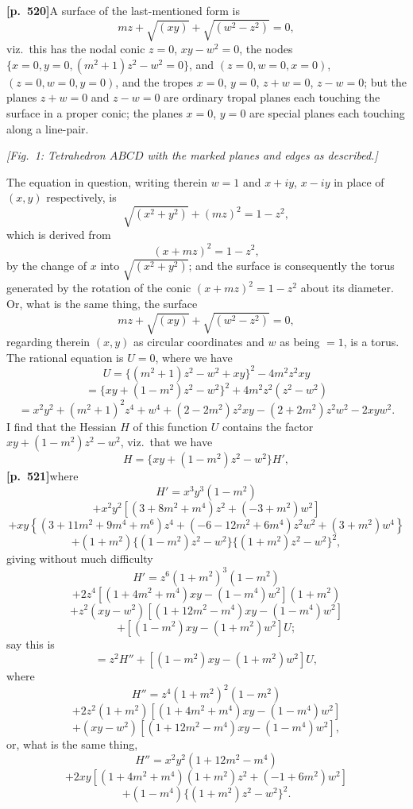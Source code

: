 \documentclass[11pt,a4paper]{article}
\begin{document}
\noindent\textbf{[p.~520]}\quad A surface of the last-mentioned form is
\[
mz + \sqrt{(xy)} + \sqrt{(w^{2} - z^{2})} = 0,
\]
viz.\ this has the nodal conic $z = 0$, $xy - w^{2} = 0$, the nodes $\{x = 0, y = 0, (m^{2} + 1)z^{2} - w^{2} = 0\}$, and $(z = 0, w = 0, x = 0)$, $(z = 0, w = 0, y = 0)$, and the tropes $x = 0$, $y = 0$, $z + w = 0$, $z - w = 0$; but the planes $z + w = 0$ and $z - w = 0$ are ordinary tropal planes each touching the surface in a proper conic; the planes $x = 0$, $y = 0$ are special planes each touching along a line-pair.

\begin{center}
\textit{[Fig.~1: Tetrahedron $ABCD$ with the marked planes and edges as described.]}
\end{center}

The equation in question, writing therein $w = 1$ and $x + iy$, $x - iy$ in place of $(x, y)$ respectively, is
\[
\sqrt{(x^{2} + y^{2})} + (mz)^{2} = 1 - z^{2},
\]
which is derived from
\[
(x + mz)^{2} = 1 - z^{2},
\]
by the change of $x$ into $\sqrt{(x^{2} + y^{2})}$; and the surface is consequently the torus generated by the rotation of the conic $(x + mz)^{2} = 1 - z^{2}$ about its diameter. Or, what is the same thing, the surface
\[
mz + \sqrt{(xy)} + \sqrt{(w^{2} - z^{2})} = 0,
\]
regarding therein $(x, y)$ as circular coordinates and $w$ as being $= 1$, is a torus. The rational equation is $U = 0$, where we have
\[
U = \{(m^{2} + 1)z^{2} - w^{2} + xy\}^{2} - 4m^{2}z^{2}xy
\]
\[
= \{xy + (1 - m^{2})z^{2} - w^{2}\}^{2} + 4m^{2}z^{2}(z^{2} - w^{2})
\]
\[
= x^{2}y^{2} + (m^{2} + 1)^{2}z^{4} + w^{4} + (2 - 2m^{2})z^{2}xy - (2 + 2m^{2})z^{2}w^{2} - 2xyw^{2}.
\]
I find that the Hessian $H$ of this function $U$ contains the factor $xy + (1 - m^{2})z^{2} - w^{2}$, viz.\ that we have
\[
H = \{xy + (1 - m^{2})z^{2} - w^{2}\}H',
\]
\noindent\textbf{[p.~521]}\quad where
\[
H' = x^{3}y^{3}(1 - m^{2})
\]
\[
+ x^{2}y^{2}\left[(3 + 8m^{2} + m^{4})z^{2} + (-3 + m^{2})w^{2}\right]
\]
\[
+ xy\left\{(3 + 11m^{2} + 9m^{4} + m^{6})z^{4} + (-6 - 12m^{2} + 6m^{4})z^{2}w^{2} + (3 + m^{2})w^{4}\right\}
\]
\[
+ (1 + m^{2})\{(1 - m^{2})z^{2} - w^{2}\}\{(1 + m^{2})z^{2} - w^{2}\}^{2},
\]
giving without much difficulty
\[
H' = z^{6}(1 + m^{2})^{3}(1 - m^{2})
\]
\[
+ 2z^{4}\left[(1 + 4m^{2} + m^{4})xy - (1 - m^{4})w^{2}\right](1 + m^{2})
\]
\[
+ z^{2}(xy - w^{2})\left[(1 + 12m^{2} - m^{4})xy - (1 - m^{4})w^{2}\right]
\]
\[
+ \left[(1 - m^{2})xy - (1 + m^{2})w^{2}\right]U;
\]
say this is
\[
= z^{2}H'' + [(1 - m^{2})xy - (1 + m^{2})w^{2}]U,
\]
where
\[
H'' = z^{4}(1 + m^{2})^{2}(1 - m^{2})
\]
\[
+ 2z^{2}(1 + m^{2})\left[(1 + 4m^{2} + m^{4})xy - (1 - m^{4})w^{2}\right]
\]
\[
+ (xy - w^{2})\left[(1 + 12m^{2} - m^{4})xy - (1 - m^{4})w^{2}\right],
\]
or, what is the same thing,
\[
H'' = x^{2}y^{2}(1 + 12m^{2} - m^{4})
\]
\[
+ 2xy\left[(1 + 4m^{2} + m^{4})(1 + m^{2})z^{2} + (-1 + 6m^{2})w^{2}\right]
\]
\[
+ (1 - m^{4})\{(1 + m^{2})z^{2} - w^{2}\}^{2}.
\]
\end{document}

